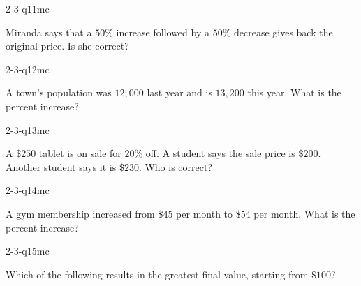 \begin{practiceQuestion}{2-3-q11}{mc}
\begin{questionText}
Miranda says that a $50\%$ increase followed by a $50\%$ decrease gives back the original price. Is she correct?
\end{questionText}
\end{practiceQuestion}

\begin{practiceQuestion}{2-3-q12}{mc}
\begin{questionText}
A town's population was $12{,}000$ last year and is $13{,}200$ this year. What is the percent increase?
\end{questionText}
\end{practiceQuestion}

\begin{practiceQuestion}{2-3-q13}{mc}
\begin{questionText}
A $\$250$ tablet is on sale for $20\%$ off. A student says the sale price is $\$200$. Another student says it is $\$230$. Who is correct?
\end{questionText}
\end{practiceQuestion}

\begin{practiceQuestion}{2-3-q14}{mc}
\begin{questionText}
A gym membership increased from $\$45$ per month to $\$54$ per month. What is the percent increase?
\end{questionText}
\end{practiceQuestion}

\begin{practiceQuestion}{2-3-q15}{mc}
\begin{questionText}
Which of the following results in the greatest final value, starting from $\$100$?
\end{questionText}
\end{practiceQuestion}

